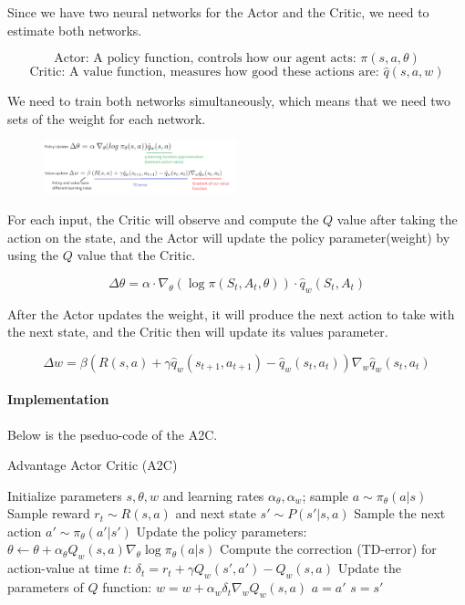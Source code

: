 \documentclass{article}
\begin{document}
Since we have two neural networks for the Actor and the Critic,  we need to estimate both networks. \par 

$$\text{Actor: A policy function, controls how our agent acts: } \pi(s, a, \theta)$$
$$\text{Critic: A value function, measures how good these actions are: } \hat{q}(s, a, w)$$

We need to train both networks simultaneously, which means that we need two sets of the weight for each network. \par

\begin{figure}[H]
    \centering
    \includegraphics[width=0.5\textwidth]{A2C_eq.png}
\end{figure}

For each input, the Critic will observe and compute the $Q$ value after taking the action on the state, and the Actor will update the policy parameter(weight) by using the $Q$ value that the Critic. \par 

$$\Delta \theta = \alpha \cdot \nabla_{\theta} (\log{\pi (S_t, A_t, \theta)}) \cdot \hat{q}_w(S_t, A_t)$$

After the Actor updates the weight, it will produce the next action to take with the next state, and the Critic then will update its values parameter. \par 

$$\Delta w = \beta(R(s, a) + \gamma \hat{q}_w(s_{t + 1}, a_{t + 1}) - \hat{q}_w(s_t, a_t)) \nabla_w \hat{q}_w(s_t, a_t)$$

\paragraph{Implementation}
Below is the pseduo-code of the A2C. \par 
\begin{algorithm}[H]
    \caption{Advantage Actor Critic (A2C)}
    Initialize parameters $s, \theta, w$ and learning rates $\alpha_{\theta}, \alpha_{w}$; sample $a \sim \pi_{\theta}(a|s)$\;
    {
        Sample reward $r_t \sim R(s, a)$ and next state $s' \sim P(s'|s, a)$\;
        Sample the next action $a' \sim \pi_{\theta}(a'|s')$\;
        Update the policy parameters: $\theta \leftarrow \theta + \alpha_{\theta} Q_w(s, a) \nabla_{\theta} \log{\pi_{\theta} (a|s)}$\;
        Compute the correction (TD-error) for action-value at time $t$: $\delta_t  = r_t + \gamma Q_w(s', a') - Q_w(s, a)$\;
        Update the parameters of $Q$ function: $w = w + \alpha_w \delta_t \nabla_w Q_w(s, a)$
        $a = a'$\;
        $s = s'$\;
    }
\end{algorithm}
\end{document}

